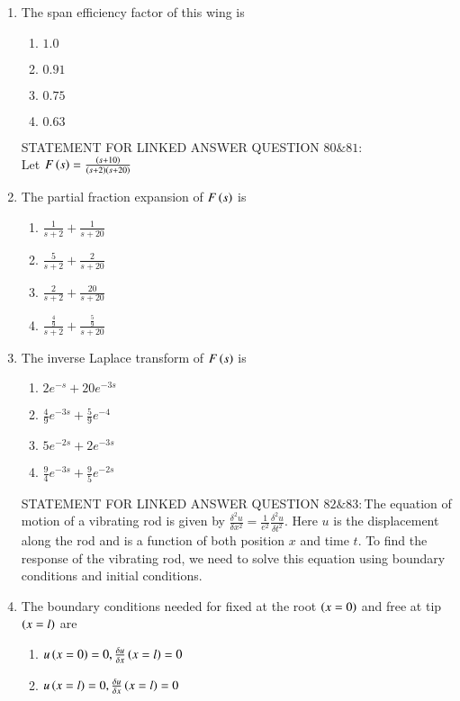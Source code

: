 \documentclass[journal]{IEEEtran}
\begin{document}
\begin{enumerate}
\begin{enumerate}
    \end{enumerate}
    \item The span efficiency factor of this wing is 
    \begin{enumerate}
        \item $1.0$
        \item $0.91$
        \item $0.75$
        \item $0.63$
    \end{enumerate}
    STATEMENT FOR LINKED ANSWER QUESTION $80\&81:$\\
    Let $F\left(s\right)=\frac{\left(s+10\right)}{\left(s+2\right)\left(s+20\right)}$
    \item The partial fraction expansion of $F\left(s\right)$ is
    \begin{enumerate}
        \item $\frac{1}{s+2}+\frac{1}{s+20}$
        \item $\frac{5}{s+2}+\frac{2}{s+20}$
        \item $\frac{2}{s+2}+\frac{20}{s+20}$
        \item $\frac{\frac{4}{9}}{s+2}+\frac{\frac{5}{9}}{s+20}$
    \end{enumerate}
    \item The inverse Laplace transform of $F\left(s\right)$ is
    \begin{enumerate}
        \item $2e^{-s}+20e^{-3s}$
        \item $\frac{4}{9}e^{-3s}+\frac{5}{9}e^{-4}$
        \item $5e^{-2s}+2e^{-3s}$
        \item $\frac{9}{4}e^{-3s}+\frac{9}{5}e^{-2s}$
    \end{enumerate}
    STATEMENT FOR LINKED ANSWER QUESTION $82\&83:$The equation of motion of a vibrating rod is given by $\frac{\delta^2 u}{\delta x^2}=\frac{1}{e^2}\frac{\delta^2 u}{\delta t^2}.$ Here $u$ is the displacement along the rod and is a function of both position $x$ and time $t$. To find the response of the vibrating rod, we need to solve this equation using boundary conditions and initial conditions.
    \item The boundary conditions needed for fixed at the root $\left(x=0\right)$ and free at tip $\left(x=l\right)$ are
    \begin{enumerate}
        \item $u\left(x=0\right)=0,\frac{\delta u}{\delta x}\left(x=l\right)=0$
        \item $u\left(x=l\right)=0,\frac{\delta u}{\delta x}\left(x=l\right)=0$

\end{enumerate}
\end{enumerate}
\end{document}
